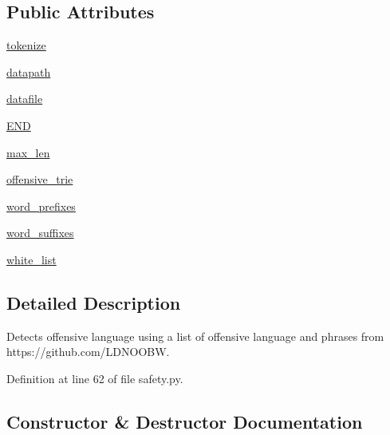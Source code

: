 \subsection*{Public Attributes}
\begin{DoxyCompactItemize}
\item 
\hyperlink{classparlai_1_1utils_1_1safety_1_1OffensiveStringMatcher_a6c9ecda500832f159ede21f3a73ee56b}{tokenize}
\item 
\hyperlink{classparlai_1_1utils_1_1safety_1_1OffensiveStringMatcher_a8c7a5276c0d2ed281a19bbcbcee3b8af}{datapath}
\item 
\hyperlink{classparlai_1_1utils_1_1safety_1_1OffensiveStringMatcher_a47317e09499753db2a16fc36fd39de90}{datafile}
\item 
\hyperlink{classparlai_1_1utils_1_1safety_1_1OffensiveStringMatcher_a50a8ff283ddb837060366bba52d8136c}{E\+ND}
\item 
\hyperlink{classparlai_1_1utils_1_1safety_1_1OffensiveStringMatcher_a3be92b9eb75dc4e4939010af668e724f}{max\+\_\+len}
\item 
\hyperlink{classparlai_1_1utils_1_1safety_1_1OffensiveStringMatcher_a4fe018f2abe2a73114d783645c006c1b}{offensive\+\_\+trie}
\item 
\hyperlink{classparlai_1_1utils_1_1safety_1_1OffensiveStringMatcher_aa880cf00a0354c45f576c3d933a1435e}{word\+\_\+prefixes}
\item 
\hyperlink{classparlai_1_1utils_1_1safety_1_1OffensiveStringMatcher_af474171a03d288a3d8adaa2287eedc8c}{word\+\_\+suffixes}
\item 
\hyperlink{classparlai_1_1utils_1_1safety_1_1OffensiveStringMatcher_a65169673f0ff35c5e1f0258585540389}{white\+\_\+list}
\end{DoxyCompactItemize}


\subsection{Detailed Description}
\begin{DoxyVerb}Detects offensive language using a list of offensive language and phrases
from https://github.com/LDNOOBW.
\end{DoxyVerb}
 

Definition at line 62 of file safety.\+py.



\subsection{Constructor \& Destructor Documentation}
\mbox{\label{classparlai_1_1utils_1_1safety_1_1OffensiveStringMatcher_a9e850e121799468d26c5720be21bf72c}} 
